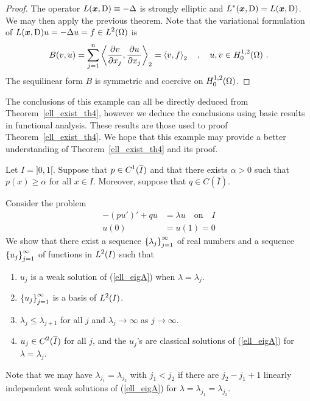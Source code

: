 \begin{proof}
The operator $L({\bm{x}},\operatorname{D}) \equiv - \Delta$ is strongly elliptic
and $\displaystyle L^\ast({\bm{x}},\operatorname{D}) = L({\bm{x}},\operatorname{D})$.  We may
then apply the previous theorem.  Note that the variational formulation of
$\displaystyle L({\bm{x}},\operatorname{D})u = - \Delta u = f \in L^2(\Omega)$ is
\[
B(v,u) = \sum_{j=1}^n \left\langle{\frac{\partial{v}}{\partial x_j}} , {\frac{\partial{u}}{\partial x_j}}\right\rangle_2 = \left\langle{v} , {f}\right\rangle_2 \quad,
\quad u, v \in H^{1,2}_0(\Omega) \ .
\]
The sequilinear form $B$ is symmetric and coercive on
$\displaystyle H^{1,2}_0(\Omega)$.  
\end{proof}

\begin{egg}
The conclusions of this example can all be directly deduced from
Theorem~\ref{ell_exist_th4}, however we deduce the conclusions using
basic results in functional analysis.  These results are those used
to proof Theorem~\ref{ell_exist_th4}.  We hope that this example may
provide a better understanding of Theorem~\ref{ell_exist_th4} and its
proof.

Let $I = ]0,1[$.  Suppose that $\displaystyle p \in C^1(\overline{I})$ and that
there exists $\alpha>0$ such that $p(x) \geq \alpha$ for all
$x \in I$.  Moreover, suppose that $q \in C(\overline{I})$.

Consider the problem
\begin{equation} \label{ell_eigA}
\begin{split}
-(p u')' + q u &= \lambda u \quad \text{on} \quad I \\
u(0) &= u(1) = 0
\end{split}
\end{equation}
We show that there exist a sequence
$\displaystyle \left\{\lambda_j\right\}_{j=1}^\infty$ of real
numbers and a sequence $\displaystyle \left\{u_j\right\}_{j=1}^\infty$
of functions in $\displaystyle L^2(I)$ such that
\begin{enumerate}
\item $u_j$ is a weak solution of (\ref{ell_eigA}) when
$\lambda = \lambda_j$.
\item $\displaystyle \left\{u_j\right\}_{j=1}^\infty$ is a basis of
$\displaystyle L^2(I)$.
\item $\lambda_j \leq \lambda_{j+1}$ for all $j$ and
$\lambda_j \to \infty$ as $j \to \infty$.
\item $\displaystyle u_j \in C^2(\overline{I})$ for all $j$,
and the $u_j$'s are
classical solutions of (\ref{ell_eigA}) for $\lambda = \lambda_j$.
\end{enumerate}

Note that we may have $\lambda_{j_1} = \lambda_{j_2}$ with $j_1 < j_2$
if there are $j_2 -j_1 + 1$ linearly independent weak solutions of
(\ref{ell_eigA}) for $\lambda = \lambda_{j_1} = \lambda_{j_2}$.


\end{egg}
